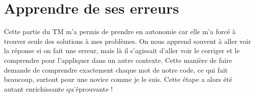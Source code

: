 \documentclass[a4,10pt,french]{sphinxmanual}
\begin{document}
\section{Apprendre de ses erreurs}
\label{\detokenize{chapitre-03:apprendre-de-ses-erreurs}}
\sphinxAtStartPar
Cette partie du TM m’a permis de prendre en autonomie car elle m’a forcé à trouver seule des solutions à mes problèmes. On nous apprend souvent à aller voir la réponse si on fait une erreur, mais là il s’agissait d’aller voir le corriger et le comprendre pour l’appliquer dans un autre contexte. Cette manière de faire demande de comprendre exactement chaque mot de notre code, ce qui fait beaucoup, surtout pour une novice comme je le suis. Cette étape a alors été autant enrichissante qu’éprouvante !



\renewcommand{\indexname}{Index}
\printindex
\end{document}
